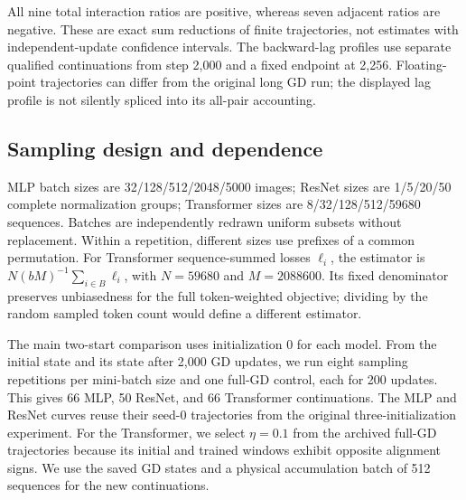 \begin{table}[H]
\centering\small
\caption{Complete GD endpoint and finite-step sign audit. $E=\sum\|g_t\|^2$, $I_{\rm all}=2\sum_{i<j}g_i^\top g_j$, and $I_1=2\sum_t g_{t-1}^\top g_t$ use all applied gradients. Ratios remove the common $\eta^2$ factor. Sign errors compare the incoming quadratic surrogate with 2,999 actual transitions; the final unpaired update is excluded. No noise is present.}
\label{tab:t-gd}

\end{table}

All nine total interaction ratios are positive, whereas seven adjacent ratios are negative. These are exact sum reductions of finite trajectories, not estimates with independent-update confidence intervals. The backward-lag profiles use separate qualified continuations from step 2,000 and a fixed endpoint at 2,256. Floating-point trajectories can differ from the original long GD run; the displayed lag profile is not silently spliced into its all-pair accounting.

\subsection{Sampling design and dependence}
MLP batch sizes are 32/128/512/2048/5000 images; ResNet sizes are 1/5/20/50 complete normalization groups; Transformer sizes are 8/32/128/512/59680 sequences. Batches are independently redrawn uniform subsets without replacement. Within a repetition, different sizes use prefixes of a common permutation. For Transformer sequence-summed losses $\ell_i$, the estimator is $N(bM)^{-1}\sum_{i\in B}\ell_i$, with $N=59680$ and $M=2088600$. Its fixed denominator preserves unbiasedness for the full token-weighted objective; dividing by the random sampled token count would define a different estimator.

The main two-start comparison uses initialization 0 for each model. From the initial state and its state after 2,000 GD updates, we run eight sampling repetitions per mini-batch size and one full-GD control, each for 200 updates. This gives 66 MLP, 50 ResNet, and 66 Transformer continuations. The MLP and ResNet curves reuse their seed-0 trajectories from the original three-initialization experiment. For the Transformer, we select $\eta=0.1$ from the archived full-GD trajectories because its initial and trained windows exhibit opposite alignment signs. We use the saved GD states and a physical accumulation batch of 512 sequences for the new continuations.

